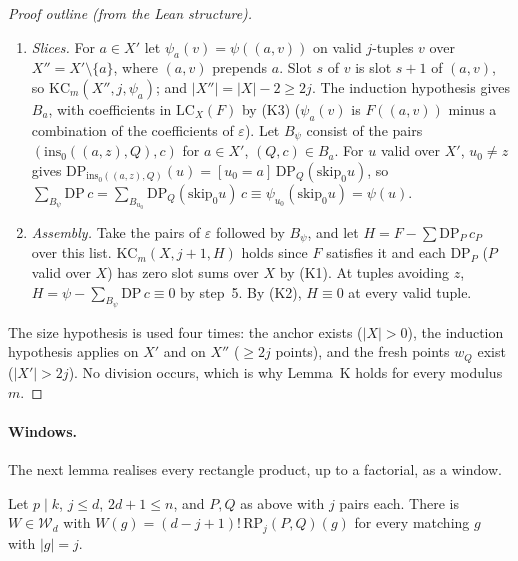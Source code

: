 \begin{proof}[Proof outline (from the Lean structure)]
\begin{enumerate}
\[\]
\item \emph{Slices.}  For $a\in X'$ let $\psi_a(v)=\psi((a,v))$ on valid $j$-tuples $v$ over
$X''=X'\setminus\{a\}$, where $(a,v)$ prepends $a$.  Slot $s$ of $v$ is slot $s+1$ of
$(a,v)$, so $\mathrm{KC}_m(X'',j,\psi_a)$; and $|X''|=|X|-2\ge2j$.  The induction hypothesis
gives $B_a$, with coefficients in $\mathrm{LC}_X(F)$ by (K3) ($\psi_a(v)$ is $F((a,v))$ minus a
combination of the coefficients of $\varepsilon$).  Let $B_\psi$ consist of the pairs
$(\mathrm{ins}_0((a,z),Q),c)$ for $a\in X'$, $(Q,c)\in B_a$.  For $u$ valid over $X'$,
$u_0\ne z$ gives $\mathrm{DP}_{\mathrm{ins}_0((a,z),Q)}(u)=[u_0=a]\,\mathrm{DP}_Q(\mathrm{skip}_0u)$, so
$\sum_{B_\psi}\mathrm{DP}\,c=\sum_{B_{u_0}}\mathrm{DP}_Q(\mathrm{skip}_0u)\,c\equiv\psi_{u_0}(\mathrm{skip}_0u)=\psi(u)$.
\item \emph{Assembly.}  Take the pairs of $\varepsilon$ followed by $B_\psi$, and let
$H=F-\sum\mathrm{DP}_P\,c_P$ over this list.  $\mathrm{KC}_m(X,j+1,H)$ holds since $F$ satisfies
it and each $\mathrm{DP}_P$ ($P$ valid over $X$) has zero slot sums over $X$ by (K1).  At
tuples avoiding $z$, $H=\psi-\sum_{B_\psi}\mathrm{DP}\,c\equiv0$ by step~5.  By (K2),
$H\equiv0$ at every valid tuple.
\end{enumerate}
The size hypothesis is used four times: the anchor exists ($|X|>0$), the induction
hypothesis applies on $X'$ and on $X''$ ($\ge2j$ points), and the fresh points $w_Q$ exist
($|X'|>2j$).  No division occurs, which is why Lemma~K holds for every modulus $m$.

\end{proof}

\paragraph{Windows.}  The next lemma realises every rectangle product, up to a
factorial, as a window.

\begin{lemma}\label{lem:window}
Let $p\mid k$, $j\le d$, $2d+1\le n$, and $P,Q$ as above with $j$ pairs each.  There
is $W\in\mathcal W_d$ with $W(g)=(d-j+1)!\,\mathrm{RP}_j(P,Q)(g)$ for every matching
$g$ with $|g|=j$.
\end{lemma}

